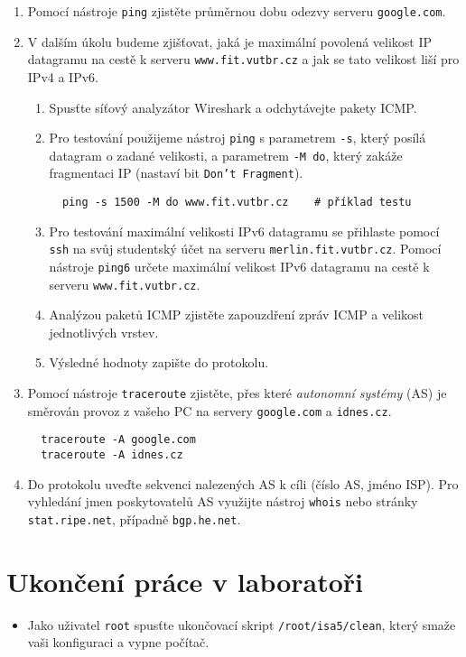 \documentclass[a4paper,11pt]{article}
\begin{document}
\begin{enumerate}
  \item Pomocí nástroje \texttt{ping} zjistěte průměrnou dobu odezvy serveru \texttt{google.com}.
  \item V dalším úkolu budeme zjišťovat, jaká je maximální povolená velikost IP datagramu na cestě k serveru \texttt{www.fit.vutbr.cz} a jak se tato velikost liší pro IPv4 a IPv6.
  \begin{enumerate}
    \item Spusťte síťový analyzátor Wireshark a odchytávejte pakety ICMP.
    \item Pro testování použijeme nástroj {\tt ping} s parametrem \texttt{-s}, který posílá datagram o zadané velikosti, a parametrem \texttt{-M do}, který zakáže fragmentaci IP (nastaví bit \texttt{Don't Fragment}).
\begin{verbatim}
  ping -s 1500 -M do www.fit.vutbr.cz    # příklad testu        
\end{verbatim}
    \item Pro testování maximální velikosti IPv6 datagramu se přihlaste pomocí {\tt ssh} na svůj studentský účet na serveru {\tt merlin.fit.vutbr.cz}. Pomocí nástroje {\tt ping6} určete maximální velikost IPv6 datagramu na cestě k serveru \texttt{www.fit.vutbr.cz}.
    \item Analýzou paketů ICMP  zjistěte zapouzdření zpráv ICMP a velikost jednotlivých vrstev.
    \item Výsledné hodnoty zapište do protokolu. 
  \end{enumerate}
  \item Pomocí nástroje \texttt{traceroute} zjistěte, přes které {\em autonomní systémy} (AS) je směrován provoz z vašeho PC na servery \texttt{google.com} a \texttt{idnes.cz}.
\begin{verbatim}
  traceroute -A google.com
  traceroute -A idnes.cz
\end{verbatim}
  \item Do protokolu uveďte sekvenci nalezených AS k cíli (číslo AS, jméno ISP). Pro vyhledání jmen poskytovatelů AS využijte nástroj {\tt whois} nebo stránky \texttt{stat.ripe.net}, případně \texttt{bgp.he.net}.
\end{enumerate}

\section*{Ukončení práce v laboratoři}
\begin{itemize}
  \item Jako uživatel {\tt root} spusťte ukončovací skript {\tt /root/isa5/clean}, který smaže vaši konfiguraci a vypne počítač. 
\end{itemize}
\end{document}
